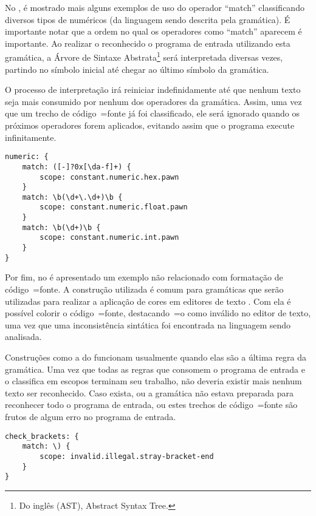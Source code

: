 No ,
é mostrado mais alguns exemplos de uso do operador ``match'' classificando diversos tipos de numéricos (da linguagem sendo descrita pela gramática).
É importante notar que a ordem no qual os operadores como ``match'' aparecem é importante.
Ao realizar o reconhecido o programa de entrada utilizando esta gramática,
a Árvore de Sintaxe Abstrata\footnote{%
Do inglês (AST), Abstract Syntax Tree.
} \cite{ahoCompilerDragonBook} será interpretada diversas vezes,
partindo no símbolo inicial até chegar ao último símbolo da gramática.

O processo de interpretação irá reiniciar indefinidamente até que nenhum texto seja mais consumido por nenhum dos operadores da gramática.
Assim,
uma vez que um trecho de código~=fonte já foi classificado,
ele será ignorado quando os próximos operadores forem aplicados,
evitando assim que o programa execute infinitamente.
\begin{lstlisting}[caption={Exemplo de Gramática -- Tipos numéricos},label={exemploDeGramaticaPawn4},style=yaml_style]
numeric: {
    match: ([-]?0x[\da-f]+) {
        scope: constant.numeric.hex.pawn
    }
    match: \b(\d+\.\d+)\b {
        scope: constant.numeric.float.pawn
    }
    match: \b(\d+)\b {
        scope: constant.numeric.int.pawn
    }
}
\end{lstlisting}

Por fim,
no  é apresentado um exemplo não relacionado com formatação de código~=fonte.
A construção utilizada é comum para gramáticas que serão utilizadas para realizar a aplicação de cores em editores de texto \cite{vsCodeSyntaxHighlighthing}.
Com ela é possível colorir o código~=fonte,
destacando~=o como inválido no editor de texto,
uma vez que uma inconsistência sintática foi encontrada na linguagem sendo analisada.

Construções como a do  funcionam usualmente quando elas são a última regra da gramática.
Uma vez que todas as regras que consomem o programa de entrada e
o classifica em escopos terminam seu trabalho,
não deveria existir mais nenhum texto ser reconhecido.
Caso exista,
ou a gramática não estava preparada para reconhecer todo o programa de entrada,
ou estes trechos de código~=fonte são frutos de algum erro no programa de entrada.
\begin{lstlisting}[caption={Exemplo de Gramática -- Reconhecimento de Erros},label={exemploDeGramaticaPawn5},style=yaml_style]
check_brackets: {
    match: \) {
        scope: invalid.illegal.stray-bracket-end
    }
}
\end{lstlisting}


